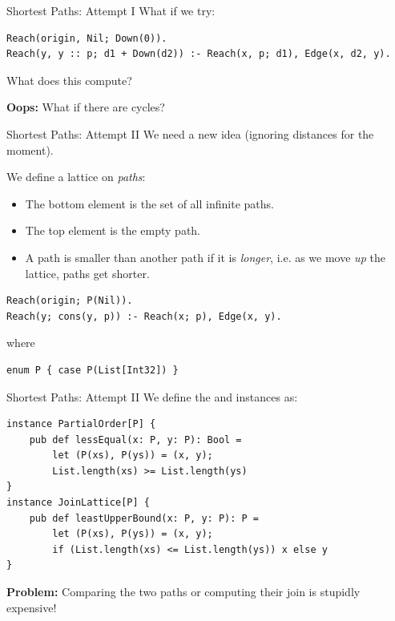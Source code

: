 \begin{frame}[fragile]{Shortest Paths: Attempt I}
What if we try:

\begin{lstlisting}[language=flix, xleftmargin=0.8cm]
Reach(origin, Nil; Down(0)).
Reach(y, y :: p; d1 + Down(d2)) :- Reach(x, p; d1), Edge(x, d2, y).
\end{lstlisting}

What does this compute?

\textbf{Oops:} What if there are cycles?
\end{frame}
    
\begin{frame}[fragile]{Shortest Paths: Attempt II}
We need a new idea (ignoring distances for the moment).

We define a lattice on \emph{paths}:

\begin{itemize}
    \item The bottom element is the set of all infinite paths.
    \item The top element is the empty path.
    \item A path is smaller than another path if it is \emph{longer}, i.e. as we
    move \emph{up} the lattice, paths get shorter. 
\end{itemize}

\begin{lstlisting}[language=flix, xleftmargin=0.8cm]
Reach(origin; P(Nil)).
Reach(y; cons(y, p)) :- Reach(x; p), Edge(x, y).
\end{lstlisting}

where

\begin{lstlisting}[language=flix, xleftmargin=0.8cm]
enum P { case P(List[Int32]) }
\end{lstlisting}
\end{frame}

\begin{frame}[fragile]{Shortest Paths: Attempt II}
We define the  and  instances as:

\begin{lstlisting}[language=flix, xleftmargin=0.8cm]
instance PartialOrder[P] {
    pub def lessEqual(x: P, y: P): Bool = 
        let (P(xs), P(ys)) = (x, y);
        List.length(xs) >= List.length(ys)
}
instance JoinLattice[P] {
    pub def leastUpperBound(x: P, y: P): P = 
        let (P(xs), P(ys)) = (x, y);
        if (List.length(xs) <= List.length(ys)) x else y
}
\end{lstlisting}

\textbf{Problem:} Comparing the two paths or computing their join is stupidly expensive!
\end{frame}

